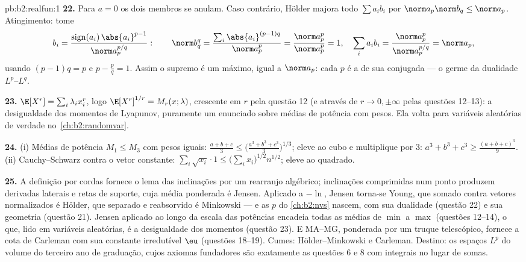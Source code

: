 \begin{solution}{pb:b2:realfun:1}
\textbf{22.} Para $a = 0$ os dois membros se anulam. Caso contrário, Hölder
majora todo $\sum a_ib_i$ por $\norm a_p\norm b_q \leq \norm
a_p$. Atingimento: tome
\[
b_i = \frac{\operatorname{sign}(a_i)\,\abs{a_i}^{p-1}}
{\norm a_p^{p/q}} :
\qquad
\norm b_q^q = \frac{\sum_i\abs{a_i}^{(p-1)q}}{\norm a_p^{p}}
= \frac{\norm a_p^p}{\norm a_p^p} = 1,
\quad
\sum_ia_ib_i = \frac{\norm a_p^p}{\norm a_p^{p/q}} =
\norm a_p ,
\]
usando $(p-1)q = p$ e $p - \frac pq = 1$. Assim o supremo é um
máximo, igual a $\norm a_p$: cada  $p$ é a   de
sua conjugada --- o germe da dualidade $L^p$--$L^q$.

\textbf{23.} $\E[X^r] = \sum_i\lambda_ix_i^r$, logo
$\E[X^r]^{1/r} = M_r(x; \lambda)$, crescente em $r$ pela
questão 12 (e através de $r \to 0, \pm\infty$ pelas questões
12--13): a desigualdade dos momentos de Lyapunov, puramente um enunciado sobre
médias de potência com pesos. Ela volta para variáveis aleatórias de verdade
no~\cref{ch:b2:randomvar}.

\textbf{24.} (i) Médias de potência $M_1 \leq M_3$ com pesos iguais:
$\frac{a+b+c}3 \leq \bigl(\frac{a^3+b^3+c^3}3\bigr)^{1/3}$;
eleve ao cubo e multiplique por $3$: $a^3 + b^3 + c^3 \geq
\frac{(a+b+c)^3}9$. (ii) Cauchy--Schwarz contra o vetor
constante: $\sum_i\sqrt{x_i}\cdot1 \leq
\bigl(\sum_ix_i\bigr)^{1/2}n^{1/2}$; eleve ao quadrado.

\textbf{25.} A definição por cordas fornece o lema das inclinações por um
rearranjo algébrico; inclinações comprimidas num ponto produzem
derivadas laterais e retas de suporte, cuja média ponderada
é Jensen. Aplicado a $-\ln$, Jensen torna-se Young, que
somado contra vetores normalizados é Hölder, que separado e
reabsorvido é Minkowski --- e as  $p$ do
\cref{ch:b2:nvs} nascem, com sua dualidade (questão 22)
e sua geometria (questão 21). Jensen aplicado ao longo da
escala das potências encadeia todas as médias de $\min$ a $\max$
(questões 12--14), o que, lido em variáveis aleatórias, é a
desigualdade dos momentos (questão 23). E MA--MG, ponderada por um
truque telescópico, fornece a cota de Carleman com sua
constante irredutível $\eu$ (questões 18--19). Cumes:
Hölder--Minkowski e Carleman. Destino: os espaços $L^p$
do volume do terceiro ano de graduação, cujos axiomas fundadores são exatamente
as questões 6 e 8 com integrais no lugar de somas.
\end{solution}
